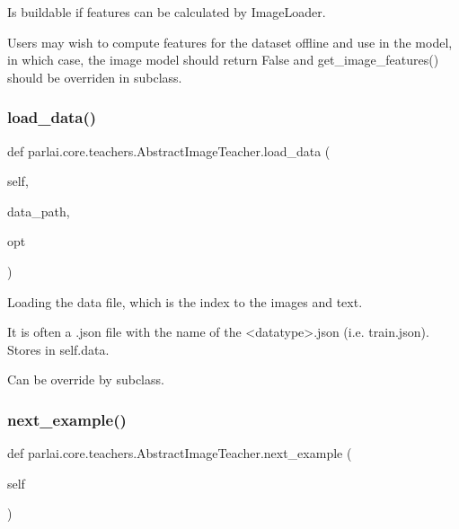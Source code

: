 \begin{DoxyVerb}Is buildable if features can be calculated by ImageLoader.

Users may wish to compute features for the dataset offline and use in the model,
in which case, the image model should return False and get_image_features()
should be overriden in subclass.
\end{DoxyVerb}
 \mbox{\label{classparlai_1_1core_1_1teachers_1_1AbstractImageTeacher_ad110a80a077e9e1135d4241083786199}} 
\subsubsection{\texorpdfstring{load\+\_\+data()}{load\_data()}}
{\footnotesize\ttfamily def parlai.\+core.\+teachers.\+Abstract\+Image\+Teacher.\+load\+\_\+data (\begin{DoxyParamCaption}\item[{}]{self,  }\item[{}]{data\+\_\+path,  }\item[{}]{opt }\end{DoxyParamCaption})}

\begin{DoxyVerb}Loading the data file, which is the index to the images and text.

It is often a .json file with the name of the <datatype>.json (i.e.
train.json). Stores in self.data.

Can be override by subclass.
\end{DoxyVerb}
 \mbox{\label{classparlai_1_1core_1_1teachers_1_1AbstractImageTeacher_ae519608a207d86bd7801f3043ff0ebf5}} 
\subsubsection{\texorpdfstring{next\+\_\+example()}{next\_example()}}
{\footnotesize\ttfamily def parlai.\+core.\+teachers.\+Abstract\+Image\+Teacher.\+next\+\_\+example (\begin{DoxyParamCaption}\item[{}]{self }\end{DoxyParamCaption})}

